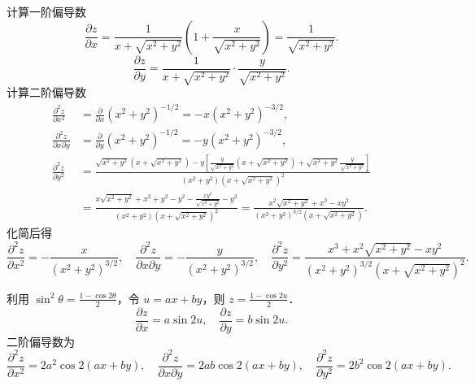 \begin{solution}
    计算一阶偏导数
    \begin{equation}
        \frac{\partial z}{\partial x} = \frac{1}{x + \sqrt{x^{2}+y^{2}}} \left( 1 + \frac{x}{\sqrt{x^{2}+y^{2}}} \right) = \frac{1}{\sqrt{x^{2}+y^{2}}}.
    \end{equation}
    \begin{equation}
        \frac{\partial z}{\partial y} = \frac{1}{x + \sqrt{x^{2}+y^{2}}} \cdot \frac{y}{\sqrt{x^{2}+y^{2}}}.
    \end{equation}
    计算二阶偏导数
    \begin{equation}
        \begin{aligned}
            \frac{\partial^{2} z}{\partial x^{2}}        & = \frac{\partial}{\partial x} (x^{2}+y^{2})^{-1/2} = -x(x^{2}+y^{2})^{-3/2},                                                                                                                                                            \\
            \frac{\partial^{2} z}{\partial x \partial y} & = \frac{\partial}{\partial y} (x^{2}+y^{2})^{-1/2} = -y(x^{2}+y^{2})^{-3/2},                                                                                                                                                            \\
            \frac{\partial^{2} z}{\partial y^{2}}        & = \frac{\sqrt{x^{2}+y^{2}}(x+\sqrt{x^{2}+y^{2}}) - y \left[ \frac{y}{\sqrt{x^{2}+y^{2}}}(x+\sqrt{x^{2}+y^{2}}) + \sqrt{x^{2}+y^{2}} \frac{y}{\sqrt{x^{2}+y^{2}}} \right]}{(x^{2}+y^{2})(x+\sqrt{x^{2}+y^{2}})^{2}}                      \\
                                                         & = \frac{x\sqrt{x^{2}+y^{2}} + x^{2} + y^{2} - y^{2} - \frac{xy^{2}}{\sqrt{x^{2}+y^{2}}} - y^{2}}{(x^{2}+y^{2})(x+\sqrt{x^{2}+y^{2}})^{2}} = \frac{x^{2}\sqrt{x^{2}+y^{2}} + x^{3} - xy^{2}}{(x^{2}+y^{2})^{3/2}(x+\sqrt{x^{2}+y^{2}})}.
        \end{aligned}
    \end{equation}
    化简后得
    \begin{equation}
        \boxed{\frac{\partial^{2} z}{\partial x^{2}} = -\frac{x}{(x^{2}+y^{2})^{3/2}}, \quad \frac{\partial^{2} z}{\partial x \partial y} = -\frac{y}{(x^{2}+y^{2})^{3/2}}, \quad \frac{\partial^{2} z}{\partial y^{2}} = \frac{x^{3} + x^{2}\sqrt{x^{2}+y^{2}} - xy^{2}}{(x^{2}+y^{2})^{3/2}(x+\sqrt{x^{2}+y^{2}})^{2}}.}
    \end{equation}

    利用 $\sin^{2} \theta = \frac{1 - \cos 2\theta}{2}$，令 $u = ax+by$，则 $z = \frac{1 - \cos 2u}{2}$．
    \begin{equation}
        \frac{\partial z}{\partial x} = a \sin 2u, \quad \frac{\partial z}{\partial y} = b \sin 2u.
    \end{equation}
    二阶偏导数为
    \begin{equation}
        \boxed{\frac{\partial^{2} z}{\partial x^{2}} = 2a^{2} \cos 2(ax+by), \quad \frac{\partial^{2} z}{\partial x \partial y} = 2ab \cos 2(ax+by), \quad \frac{\partial^{2} z}{\partial y^{2}} = 2b^{2} \cos 2(ax+by).}
    \end{equation}


\end{solution}
